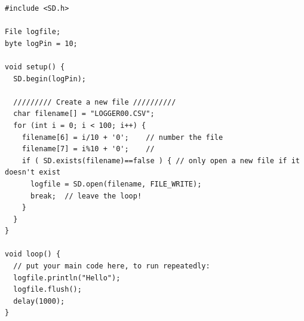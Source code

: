 \documentclass[a4paper, 12pt]{article}
\begin{document}
\vspace{10pt}

\begin{lstlisting}[style=Arduino]
#include <SD.h>

File logfile;
byte logPin = 10;

void setup() {
  SD.begin(logPin);

  ///////// Create a new file //////////
  char filename[] = "LOGGER00.CSV";
  for (int i = 0; i < 100; i++) {
    filename[6] = i/10 + '0';    // number the file
    filename[7] = i%10 + '0';    //
    if ( SD.exists(filename)==false ) { // only open a new file if it doesn't exist
      logfile = SD.open(filename, FILE_WRITE);
      break;  // leave the loop!
    }
  }
}

void loop() {
  // put your main code here, to run repeatedly:
  logfile.println("Hello");
  logfile.flush();
  delay(1000);
}
\end{lstlisting}
\end{document}
